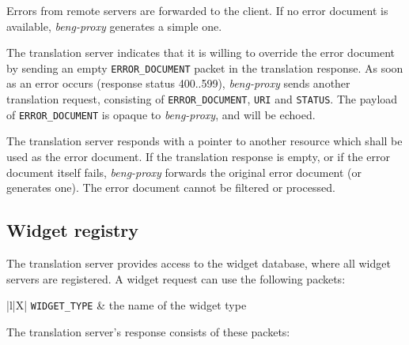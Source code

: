 \documentclass[a4paper,12pt]{article}
\begin{document}
Errors from remote servers are forwarded to the client.  If no error
document is available, \emph{beng-proxy} generates a simple one.

The translation server indicates that it is willing to override the
error document by sending an empty \verb|ERROR_DOCUMENT| packet in
the translation response.  As soon as an error occurs (response status
400..599), \emph{beng-proxy} sends another translation request,
consisting of \verb|ERROR_DOCUMENT|, \verb|URI| and
\verb|STATUS|.  The payload of \verb|ERROR_DOCUMENT| is opaque to
\emph{beng-proxy}, and will be echoed.

The translation server responds with a pointer to another resource
which shall be used as the error document.  If the translation
response is empty, or if the error document itself fails,
\emph{beng-proxy} forwards the original error document (or generates
one).  The error document cannot be filtered or processed.

\subsection{Widget registry}
\label{registry}

The translation server provides access to the widget database, where
all widget servers are registered.  A widget request can use the
following packets:

\begin{longtabu*}{|l|X|}
\hline
\verb|WIDGET_TYPE| & the name of the widget type \\
\hline
\end{longtabu*}

The translation server's response consists of these packets:
\end{document}
